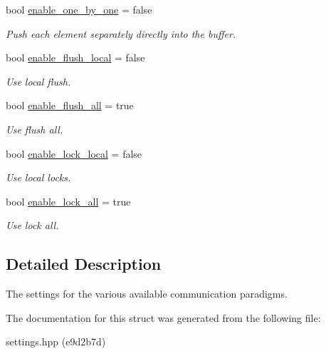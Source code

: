 \begin{DoxyCompactItemize}
bool \hyperlink{structschwz_1_1Settings_1_1comm__settings_aae063b9fcf2bc8e49e960286e4c0939f}{enable\+\_\+one\+\_\+by\+\_\+one} = false
\begin{DoxyCompactList}\small\item\em Push each element separately directly into the buffer. \end{DoxyCompactList}\item 
\mbox{\label{structschwz_1_1Settings_1_1comm__settings_a5bea917e0dc11a5a671bd4d8cdb3e3cf}} 
bool \hyperlink{structschwz_1_1Settings_1_1comm__settings_a5bea917e0dc11a5a671bd4d8cdb3e3cf}{enable\+\_\+flush\+\_\+local} = false
\begin{DoxyCompactList}\small\item\em Use local flush. \end{DoxyCompactList}\item 
\mbox{\label{structschwz_1_1Settings_1_1comm__settings_a3eb62d22f79472020fce577ceddad916}} 
bool \hyperlink{structschwz_1_1Settings_1_1comm__settings_a3eb62d22f79472020fce577ceddad916}{enable\+\_\+flush\+\_\+all} = true
\begin{DoxyCompactList}\small\item\em Use flush all. \end{DoxyCompactList}\item 
\mbox{\label{structschwz_1_1Settings_1_1comm__settings_abc715396bf51f36307caf88db02c819c}} 
bool \hyperlink{structschwz_1_1Settings_1_1comm__settings_abc715396bf51f36307caf88db02c819c}{enable\+\_\+lock\+\_\+local} = false
\begin{DoxyCompactList}\small\item\em Use local locks. \end{DoxyCompactList}\item 
\mbox{\label{structschwz_1_1Settings_1_1comm__settings_a39a59cea325ea1b57aba12e9ada4b91b}} 
bool \hyperlink{structschwz_1_1Settings_1_1comm__settings_a39a59cea325ea1b57aba12e9ada4b91b}{enable\+\_\+lock\+\_\+all} = true
\begin{DoxyCompactList}\small\item\em Use lock all. \end{DoxyCompactList}\end{DoxyCompactItemize}


\subsection{Detailed Description}
The settings for the various available communication paradigms. 

The documentation for this struct was generated from the following file\+:\begin{DoxyCompactItemize}
\item 
settings.\+hpp (e9d2b7d)\end{DoxyCompactItemize}
